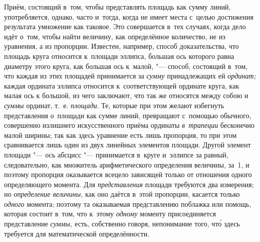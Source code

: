 Приём, состоящий в~том, чтобы представлять площадь как сумму линий,
употребляется, однако, часто и~тогда, когда не имеет места с~целью достижения
результата умножение как таковое. Это совершается в~тех случаях, когда дело
идёт о~том, чтобы найти величину, как определённое количество, не из уравнения,
а из пропорции. Известен, например, способ доказательства, что площадь круга
относится к~площади эллипса, большая ось которого равна диаметру этого круга,
как большая ось к~малой, "--- способ, состоящий в~том, что каждая из этих
площадей принимается за {\em сумму} принадлежащих ей {\em ординат;} каждая
ордината эллипса относится к~соответствующей ординате круга, как малая ось
к большой, из чего заключают, что так же относятся между собою и {\em суммы}
ординат, т.~е. {\em площади}. Те, которые при этом желают избегнуть
представления о~площади как сумме линий, превращают с~помощью обычного,
совершенно излишнего искусственного приёма ординаты {\em в~трапеции} бесконечно
малой ширины; так как здесь уравнение есть лишь пропорция, то при этом
сравнивается лишь один из двух линейных элементов площади. Другой элемент
площади "--- ось абсцисс "--- принимается в~круге и~эллипсе за равный,
следовательно, как множитель арифметического определения величины, за~1, и
поэтому пропорция оказывается всецело зависящей только от отношения одного
определяющего момента. Для {\em представления} площади требуются два измерения;
но {\em определение величины,} как оно даётся в~этой пропорции, касается только
{\em одного} момента; поэтому та оказываемая представлению поблажка или помощь,
которая состоит в~том, что к~этому {\em одному} моменту присоединяется
представление {\em суммы,} есть, собственно говоря, непонимание того, чт\'{о} здесь
требуется для математической определённости.

